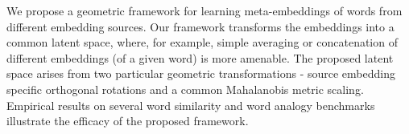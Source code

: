 We propose a geometric framework for learning meta-embeddings of words from different embedding sources. Our framework transforms the embeddings into a common latent space, where, for example, simple averaging or concatenation of different embeddings (of a given word) is more amenable. The proposed latent space arises from two particular geometric transformations - source embedding specific orthogonal rotations and a common Mahalanobis metric scaling. Empirical results on several word similarity and word analogy benchmarks illustrate the efficacy of the proposed framework.
